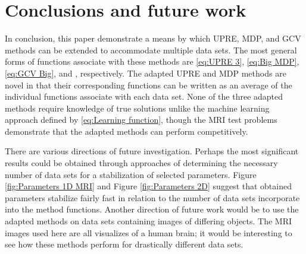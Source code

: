 \documentclass[12pt]{article}
\begin{document}
\section{Conclusions and future work} \label{sec:Conclusion}
In conclusion, this paper demonstrate a means by which UPRE, MDP, and GCV methods can be extended to accommodate multiple data sets. The most general forms of functions associate with these methods are \eqref{eq:UPRE 3}, \eqref{eq:Big MDP}, \eqref{eq:GCV Big}, and , respectively. The adapted UPRE and MDP methods are novel in that their corresponding functions can be written as an average of the individual functions associate with each data set. None of the three adapted methods require knowledge of true solutions unlike the machine learning approach defined by \eqref{eq:Learning function}, though the MRI test problems demonstrate that the adapted methods can perform competitively. \par
There are various directions of future investigation. Perhaps the most significant results could be obtained through approaches of determining the necessary number of data sets for a stabilization of selected parameters. Figure \ref{fig:Parameters 1D MRI} and Figure \ref{fig:Parameters 2D} suggest that obtained parameters stabilize fairly fast in relation to the number of data sets incorporate into the method functions. Another direction of future work would be to use the adapted methods on data sets containing images of differing objects. The MRI images used here are all visualizes of a human brain; it would be interesting to see how these methods perform for drastically different data sets.



\end{document}
